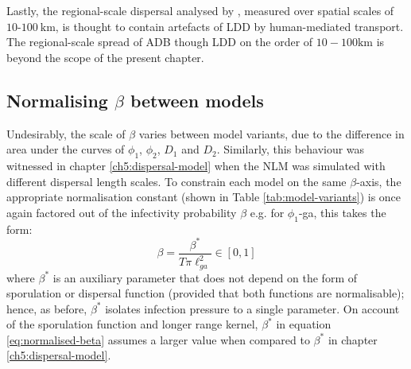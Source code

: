 Lastly, the regional-scale dispersal analysed by \cite{grosdidier2018tracking}, measured over spatial scales of $10$-$100\ \mathrm{km}$, is thought to contain artefacts of LDD by human-mediated transport.
The regional-scale spread of ADB though LDD on the order of $10-100\mathrm{km}$ is beyond the scope of the present chapter.

\subsection{Normalising $\beta$ between models}

Undesirably, the scale of $\beta$ varies between model variants, due to the difference in area under the curves of $\phi_1$, $\phi_2$, $D_1$ and $D_2$.
Similarly, this behaviour was witnessed in chapter \ref{ch5:dispersal-model} when the NLM was simulated with different dispersal length scales.
To constrain each model on the same $\beta$-axis, the appropriate normalisation constant (shown in Table \ref{tab:model-variants}) is once again factored out of the infectivity probability $\beta$ 
e.g. for $\phi_1$-ga, this takes the form: 
\begin{equation}
    \beta = \frac{\beta^*}{T \pi \ell^2_{ga}} \in [0, 1]
\label{eq:normalised-beta}
\end{equation}
where $\beta^*$ is an auxiliary parameter that does not depend on the form of sporulation or dispersal function (provided that both functions are normalisable);
hence, as before, $\beta^*$ isolates infection pressure to a single parameter.
On account of the sporulation function and longer range kernel, $\beta^*$ in equation \ref{eq:normalised-beta} assumes a larger value when compared to $\beta^*$ in chapter \ref{ch5:dispersal-model}.


